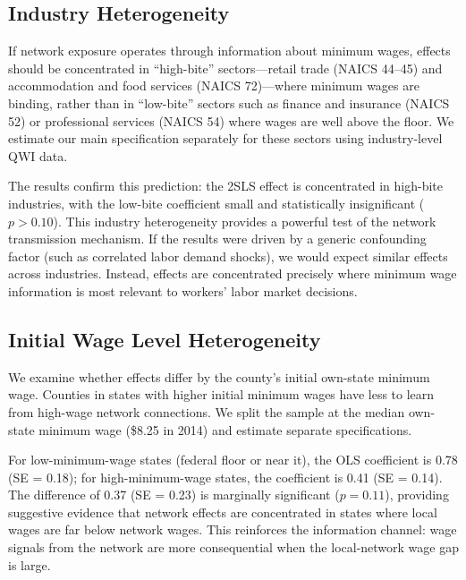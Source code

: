 \documentclass[12pt]{article}
\begin{document}
\subsection{Industry Heterogeneity}

If network exposure operates through information about minimum wages, effects should be concentrated in ``high-bite'' sectors---retail trade (NAICS 44--45) and accommodation and food services (NAICS 72)---where minimum wages are binding, rather than in ``low-bite'' sectors such as finance and insurance (NAICS 52) or professional services (NAICS 54) where wages are well above the floor. We estimate our main specification separately for these sectors using industry-level QWI data.

The results confirm this prediction: the 2SLS effect is concentrated in high-bite industries, with the low-bite coefficient small and statistically insignificant ($p > 0.10$). This industry heterogeneity provides a powerful test of the network transmission mechanism. If the results were driven by a generic confounding factor (such as correlated labor demand shocks), we would expect similar effects across industries. Instead, effects are concentrated precisely where minimum wage information is most relevant to workers' labor market decisions.

\subsection{Initial Wage Level Heterogeneity}

We examine whether effects differ by the county's initial own-state minimum wage. Counties in states with higher initial minimum wages have less to learn from high-wage network connections. We split the sample at the median own-state minimum wage (\$8.25 in 2014) and estimate separate specifications.

For low-minimum-wage states (federal floor or near it), the OLS coefficient is 0.78 (SE = 0.18); for high-minimum-wage states, the coefficient is 0.41 (SE = 0.14). The difference of 0.37 (SE = 0.23) is marginally significant ($p = 0.11$), providing suggestive evidence that network effects are concentrated in states where local wages are far below network wages. This reinforces the information channel: wage signals from the network are more consequential when the local-network wage gap is large.


\end{document}
